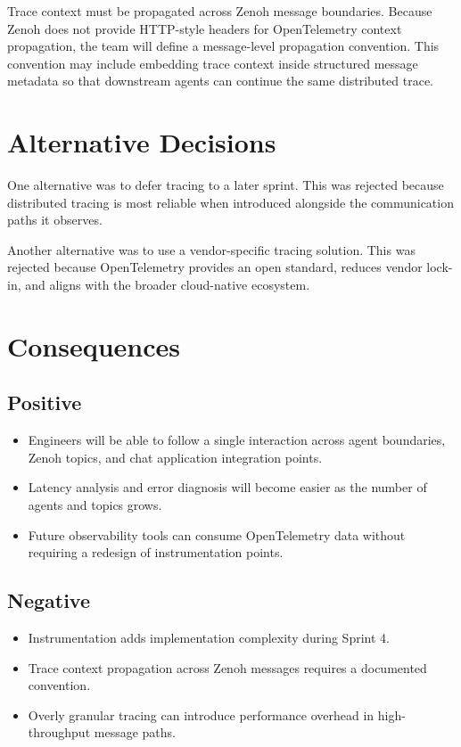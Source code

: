 \documentclass[11pt]{article}
\begin{document}
Trace context must be propagated across Zenoh message boundaries. Because Zenoh does not provide HTTP-style headers for OpenTelemetry context propagation, the team will define a message-level propagation convention. This convention may include embedding trace context inside structured message metadata so that downstream agents can continue the same distributed trace.

\section{Alternative Decisions}

One alternative was to defer tracing to a later sprint. This was rejected because distributed tracing is most reliable when introduced alongside the communication paths it observes.

Another alternative was to use a vendor-specific tracing solution. This was rejected because OpenTelemetry provides an open standard, reduces vendor lock-in, and aligns with the broader cloud-native ecosystem.

\section{Consequences}

\subsection{Positive}

\begin{itemize}
    \item Engineers will be able to follow a single interaction across agent boundaries, Zenoh topics, and chat application integration points.
    \item Latency analysis and error diagnosis will become easier as the number of agents and topics grows.
    \item Future observability tools can consume OpenTelemetry data without requiring a redesign of instrumentation points.
\end{itemize}

\subsection{Negative}

\begin{itemize}
    \item Instrumentation adds implementation complexity during Sprint 4.
    \item Trace context propagation across Zenoh messages requires a documented convention.
    \item Overly granular tracing can introduce performance overhead in high-throughput message paths.
\end{itemize}
\end{document}
